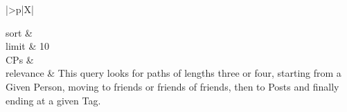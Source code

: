 \begin{tabularx}{\queryCardWidth}{|>{\queryPropertyCell}p{\queryPropertyCellWidth}|X|}
%
	
		sort		&
		\innerCardVSpace \\ \hline
	limit & 10 \\ \hline
	CPs &
	 \\ \hline
	relevance &
		\footnotesize This query looks for paths of lengths three or four, starting from a Given Person, moving to friends or friends of
friends, then to Posts and finally ending at a given Tag.
 \\ \hline%
\end{tabularx}
\queryCardVSpace

\let\emph\oldemph